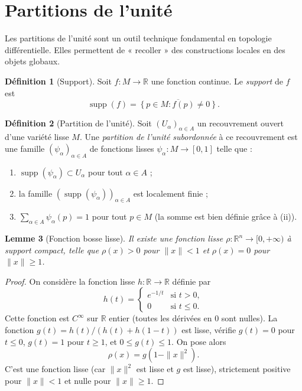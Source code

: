 \documentclass[12pt,a4paper,openany]{book}
\theoremstyle{definition}
\newtheorem{definition}{Définition}[chapter]
\theoremstyle{plain}
\newtheorem{lemme}[definition]{Lemme}
\theoremstyle{remark}
\newcommand{\R}{\mathbb{R}}
\newcommand{\set}[1]{\left\{#1\right\}}
\begin{document}
\section{Partitions de l'unité}
\label{sec:partitions-unite}

Les partitions de l'unité sont un outil technique fondamental en topologie
différentielle. Elles permettent de « recoller » des constructions locales en
des objets globaux.

\begin{definition}[Support]\label{def:support}
Soit $f \colon M \to \R$ une fonction continue. Le \emph{support} de $f$ est
\[
    \operatorname{supp}(f) = \overline{\set{p \in M : f(p) \neq 0}}.
\]
\end{definition}

\begin{definition}[Partition de l'unité]\label{def:partition-unite}
Soit $(U_\alpha)_{\alpha \in A}$ un recouvrement ouvert d'une variété lisse $M$.
Une \emph{partition de l'unité subordonnée} à ce recouvrement est une famille
$(\psi_\alpha)_{\alpha \in A}$ de fonctions lisses $\psi_\alpha \colon M \to
[0, 1]$ telle que :
\begin{enumerate}[label=(\roman*)]
    \item $\operatorname{supp}(\psi_\alpha) \subset U_\alpha$ pour tout
    $\alpha \in A$ ;
    \item la famille $(\operatorname{supp}(\psi_\alpha))_{\alpha \in A}$ est
    localement finie ;
    \item $\sum_{\alpha \in A} \psi_\alpha(p) = 1$ pour tout $p \in M$
    (la somme est bien définie grâce à (ii)).
\end{enumerate}
\end{definition}

\begin{lemme}[Fonction bosse lisse]\label{lem:fonction-bosse}
Il existe une fonction lisse $\rho \colon \R^n \to [0, +\infty)$ à support
compact, telle que $\rho(x) > 0$ pour $\|x\| < 1$ et $\rho(x) = 0$ pour
$\|x\| \geq 1$.
\end{lemme}

\begin{proof}
On considère la fonction lisse $h \colon \R \to \R$ définie par
\[
    h(t) = \begin{cases} e^{-1/t} & \text{si } t > 0, \\ 0 & \text{si }
    t \leq 0. \end{cases}
\]
Cette fonction est $C^\infty$ sur $\R$ entier (toutes les dérivées en $0$ sont
nulles). La fonction $g(t) = h(t) / (h(t) + h(1 - t))$ est lisse, vérifie
$g(t) = 0$ pour $t \leq 0$, $g(t) = 1$ pour $t \geq 1$, et $0 \leq g(t) \leq
1$. On pose alors
\[
    \rho(x) = g(1 - \|x\|^2).
\]
C'est une fonction lisse (car $\|x\|^2$ est lisse et $g$ est lisse),
strictement positive pour $\|x\| < 1$ et nulle pour $\|x\| \geq 1$.
\end{proof}
\end{document}
